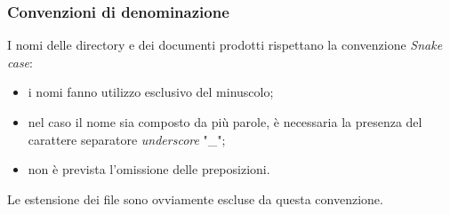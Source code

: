 \subsubsection{Convenzioni di denominazione}\label{ProcessiDiSupportoDocumentazioneNormeTipograficheConvenzioniDiDenominanzione}
I nomi delle directory e dei documenti prodotti rispettano la convenzione \textit{Snake case}:%
\begin{itemize}
  \item i nomi fanno utilizzo esclusivo del minuscolo;
  \item nel caso il nome sia composto da più parole, è necessaria la presenza del carattere separatore \textit{underscore} "\_";
  \item non è prevista l'omissione delle preposizioni.
\end{itemize}
Le estensione dei file sono ovviamente escluse da questa convenzione.
